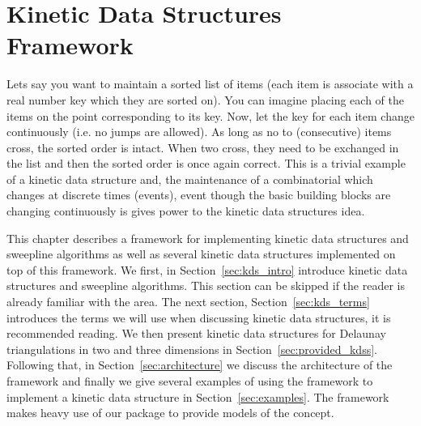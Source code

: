 
\chapter{Kinetic Data Structures Framework}
\label{chapter-kds}
\minitoc






\def\note#1{$\langle\langle${\bf #1}$\rangle\rangle$}




Lets say you want to maintain a sorted list of items (each item is
associate with a real number key which they are sorted on). You can
imagine placing each of the items on the point corresponding to its
key. Now, let the key for each item change continuously (i.e. no jumps
are allowed). As long as no to (consecutive) items cross, the sorted
order is intact. When two cross, they need to be exchanged in the list
and then the sorted order is once again correct. This is a trivial
example of a kinetic data structure and, the maintenance of a
combinatorial which changes at discrete times (events), event though
the basic building blocks are changing continuously is gives power to
the kinetic data structures idea.

This chapter describes a framework for implementing kinetic data
structures and sweepline algorithms as well as several kinetic data
structures implemented on top of this framework. We first, in
Section~\ref{sec:kds_intro} introduce kinetic data structures and
sweepline algorithms. This section can be skipped if the reader is
already familiar with the area. The next section,
Section~\ref{sec:kds_terms} introduces the terms we will use when
discussing kinetic data structures, it is recommended reading. We then
present kinetic data structures for Delaunay triangulations in two and
three dimensions in Section~\ref{sec:provided_kdss}. Following that,
in Section~\ref{sec:architecture} we discuss the architecture of the
framework and finally we give several examples of using the framework
to implement a kinetic data structure in
Section~\ref{sec:examples}. The framework makes heavy use of our
 package to provide models of the 
concept.

